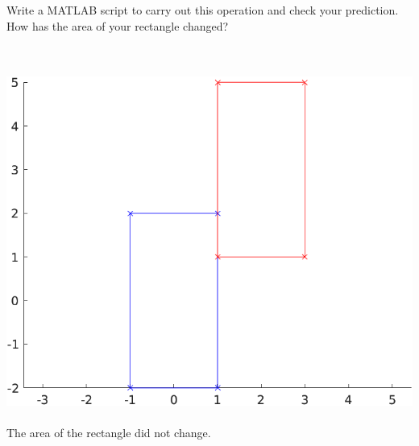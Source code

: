 Write a MATLAB script to carry out this operation and check your prediction. How has the area of your rectangle changed?

\begin{solution} \ \\
    \ \\
    \includegraphics{img/e8p3.png} \ \\
    The area of the rectangle did not change.
\end{solution}